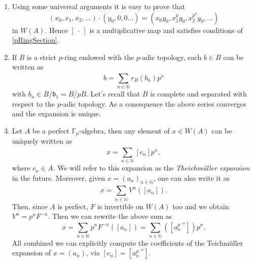 \begin{rem}[]\leavevmode\vspace{-.2\baselineskip}\label{TeichmullerExpansionWitt}
\begin{enumerate}
\item Using some universal arguments it is easy to prove that
	\begin{equation*}
		(x_0, x_1, x_2, \ldots) \cdot (y_0, 0, 0 \ldots) =
		(x_0y_0, x_1^py_0, x_2^{p^2}y_0, \ldots)
	\end{equation*}
	in $W(A)$.
	Hence $[\ \cdot\ ]$ is a multiplicative map
	and satisfies conditions of \cref{pRingSection}.

\item If $B$ is a strict $p$-ring endowed with the $p$-adic topology,
	each $b \in B$ can be written as
	\begin{equation*}
		b = \sum_{n \in \mathbb{N} }^{  } r_B(b_n) p^n
	\end{equation*}
	with $b_n \in B/\mathfrak{b}_1 = B/pB$.
	Let's recall that $B$ is complete and separated with respect to the $p$-adic
	topology.
	As a consequence the above series converges and the expansion is unique.

\item Let $A$ be a perfect $\mathbb{F}_p$-algebra, then any element of $x \in W(A)$
	can be uniquely written as
	\begin{equation*}
		x = \sum_{n \in \mathbb{N} }^{  } [c_n] p^n
	,\end{equation*}
	where $c_n \in A$.
	We will refer to this expansion as the {\em Theichmüller expansion} in the future.
	Moreover, given $x = \left( a_n \right)_{n \in \mathbb{N}}$, one can also write it as
	\begin{equation*}
		x = \sum_{n \in \mathbb{N} }^{  } V^n([a_n])
	.\end{equation*}
	Then, since $A$ is perfect, $F$ is invertible on $W(A)$ too
	and we obtain $V^n = p^n F^{-n}$. Then we can rewrite the above sum as
	\begin{equation*}
		x = 
		\sum_{n \in \mathbb{N} }^{  } p^n F^{-n}([a_n]) =
		\sum_{n \in \mathbb{N} } ([a_n^{p^{-n}}]) p^n
	.\end{equation*}
	All combined we can explicitly compute the coefficients
	of the Teichmüller expansion of $x = \left( a_n \right)$,
	via $[c_n] = [a_n^{p^{-n}}]$.
\end{enumerate}
\end{rem}


